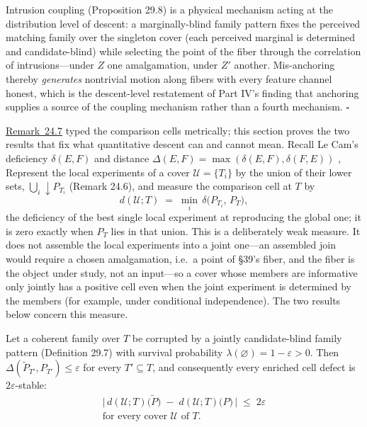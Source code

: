 \begin{thmplain}

Intrusion coupling (Proposition 29.8) is a physical mechanism acting at the distribution level of descent: a marginally-blind family pattern fixes the perceived matching family over the singleton cover (each perceived marginal is determined and candidate-blind) while selecting the point of the fiber through the correlation of intrusions---\hspace{0pt}under \(Z\) one amalgamation, under \(Z'\) another. Mis-anchoring thereby \emph{generates} nontrivial motion along fibers with every feature channel honest, which is the descent-level restatement of Part IV's finding that anchoring supplies a source of the coupling mechanism rather than a fourth mechanism. \(\square\)
\end{thmplain}


\hyperlink{stmt:24.7}{Remark~24.7} typed the comparison cells metrically; this section proves the two results that fix what quantitative descent can and cannot mean. Recall Le Cam's deficiency \(\delta(E, F)\) and distance \(\Delta(E, F) = \max(\delta(E,F), \delta(F,E))\) \autocite{lecam1964,torgersen1991}, Represent the local experiments of a cover \(\mathcal{U} = \{T_i\}\) by the union of their lower sets, \({\bigcup_i}{\downarrow}P_{T_i}\) (Remark 24.6), and measure the comparison cell at \(T\) by
\[
d(\mathcal{U}; T) \;=\; \min_i \, \delta\big(P_{T_i},\, P_T\big),
\]
the deficiency of the best single local experiment at reproducing the global one; it is zero exactly when \(P_T\) lies in that union. This is a deliberately weak measure. It does not assemble the local experiments into a joint one---\hspace{0pt}an assembled join would require a chosen amalgamation, i.e.~a point of §39's fiber, and the fiber is the object under study, not an input---\hspace{0pt}so a cover whose members are informative only jointly has a positive cell even when the joint experiment is determined by the members (for example, under conditional independence). The two results below concern this measure.

\begin{thmplain}

Let a coherent family over \(T\) be corrupted by a jointly candidate-blind family pattern (Definition 29.7) with survival probability \(\lambda(\varnothing) = 1 - \varepsilon > 0\). Then \(\Delta(\widetilde{P}_{T'}, P_{T'}) \le \varepsilon\) for every \(T' \subseteq T\), and consequently every enriched cell defect is \(2\varepsilon\)-stable:
\[\begin{gathered}\big|\, d(\mathcal{U}; T)\big(\widetilde{P}\big) \;-\; d(\mathcal{U}; T)\big(P\big) \,\big| \;\le\; 2\varepsilon \\ \text{for every cover } \mathcal{U} \text{ of } T.\end{gathered}\]
\end{thmplain}

